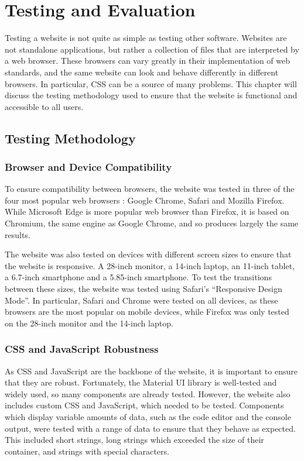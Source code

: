 \documentclass[../main.tex]{subfiles}
\begin{document}
\chapter{Testing and Evaluation} \label{ch:evaluation}
    Testing a website is not quite as simple as testing other software.
    Websites are not standalone applications, but rather a collection of files that
        are interpreted by a web browser.
    These browsers can vary greatly in their implementation of web standards, and
        the same website can look and behave differently in different browsers.
    In particular, CSS can be a source of many problems.
    This chapter will discuss the testing methodology used to ensure that the
        website is functional and accessible to all users.

    \section{Testing Methodology}
        \subsection{Browser and Device Compatibility}
            To ensure compatibility between browsers, the website was tested in three of
                the four most popular web browsers \citep{browsers}: Google Chrome, Safari and
                Mozilla Firefox.
            While Microsoft Edge is more popular web browser than Firefox, it is based on
                Chromium, the same engine as Google Chrome, and so produces largely the same
                results.

            The website was also tested on devices with different screen sizes to ensure
                that the website is responsive.
            A 28-inch monitor, a 14-inch laptop, an 11-inch tablet, a 6.7-inch smartphone
                and a 5.85-inch smartphone.
            To test the transitions between these sizes, the website was tested using
                Safari's ``Responsive Design Mode''.
            In particular, Safari and Chrome were tested on all devices, as these browsers
                are the most popular on mobile devices, while Firefox was only tested on the
                28-inch monitor and the 14-inch laptop.

        \subsection{CSS and JavaScript Robustness}
            As CSS and JavaScript are the backbone of the website, it is important to
                ensure that they are robust.
            Fortunately, the Material UI library is well-tested and widely used, so many
                components are already tested.
            However, the website also includes custom CSS and JavaScript, which needed to
                be tested.
            Components which display variable amounts of data, such as the code editor and
                the console output, were tested with a range of data to ensure that they behave
                as expected.
            This included short strings, long strings which exceeded the size of their
                container, and strings with special characters.
\end{document}
